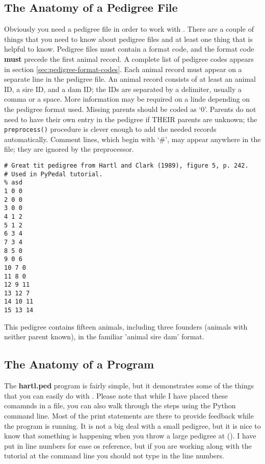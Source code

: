 \subsection{The Anatomy of a Pedigree File}
Obviously you need a pedigree file in order to work with \PYPEDAL{}.  There are a couple of things that you need to know about pedigree files and at least one thing that is helpful to know.  Pedigree files must contain a format code, and the format code \textbf{must} precede the first animal record.  A complete list of pedigree codes appears in section \ref{sec:pedigree-format-codes}.  Each animal record must appear on a separate line in the pedigree file.  An animal record consists of at least an animal ID, a sire ID, and a dam ID; the IDs are separated by a delimiter, usually a comma or a space.  More information may be required on a linde depending on the pedigree format used.  Missing parents should be coded as `0'.  Parents do not need to have their own entry in the pedigree if THEIR parents are unknown; the \texttt{preprocess()} procedure is clever enough to add the needed records automatically.  Comment lines, which begin with `\#', may appear anywhere in the file; they are ignored by the preprocessor.
\begin{verbatim}
# Great tit pedigree from Hartl and Clark (1989), figure 5, p. 242.
# Used in PyPedal tutorial.
% asd
1 0 0
2 0 0
3 0 0
4 1 2
5 1 2
6 3 4
7 3 4
8 5 0
9 0 6
10 7 0
11 8 0
12 9 11
13 12 7
14 10 11
15 13 14
\end{verbatim}
This pedigree contains fifteen animals, including three founders (animals with neither parent known), in the familiar 'animal sire dam' format.

\subsection{The Anatomy of a Program}
The \textbf{hartl.ped} program is fairly simple, but it demonstrates some of the things that you can easily do with \PYPEDAL{}.  Please note that while I have placed these comamnds in a file, you can also walk through the steps using the Python command line.  Most of the print statements are there to provide feedback while the program is running.  It is not a big deal with a small pedigree, but it is nice to know that something is happening when you throw a large pedigree at \PYPEDAL().  I have put in line numbers for ease os reference, but if you are working along with the tutorial at the command line you should not type in the line numbers.


